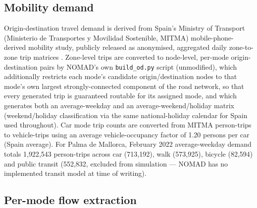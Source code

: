 \documentclass[pdflatex,sn-mathphys-ay]{sn-jnl}
\begin{document}
\subsection{Mobility demand}
\label{sec:demand}

Origin-destination travel demand is derived from Spain's Ministry of
Transport (Ministerio de Transportes y Movilidad Sostenible, MITMA)
mobile-phone-derived mobility study, publicly released as anonymised,
aggregated daily zone-to-zone trip matrices
\cite{mitma_movilidad}. Zone-level trips are converted to node-level,
per-mode origin-destination pairs by NOMAD's own \texttt{build\_od.py}
script (unmodified), which additionally restricts each mode's candidate
origin/destination nodes to that mode's own largest strongly-connected
component of the road network, so that every generated trip is guaranteed
routable for its assigned mode, and which generates both an average-weekday
and an average-weekend/holiday matrix (weekend/holiday classification via the
same national-holiday calendar for Spain used throughout). Car mode trip
counts are converted from MITMA person-trips to vehicle-trips using an
average vehicle-occupancy factor of 1.20 persons per car (Spain average). For
Palma de Mallorca, February 2022 average-weekday demand totals 1{,}922{,}543
person-trips across car (713{,}192), walk (573{,}925), bicycle (82{,}594) and
public transit (552{,}832, excluded from simulation --- NOMAD has no
implemented transit model at time of writing).

\subsection{Per-mode flow extraction}
\label{sec:flows}
\end{document}

